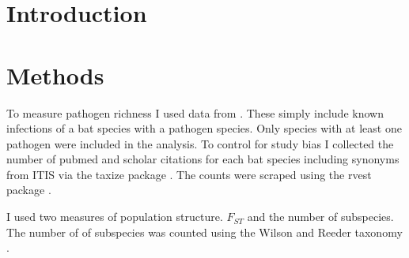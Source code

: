 
\clearpage
\section{Introduction}







\clearpage
\section{Methods}


To measure pathogen richness I used data from \cite{luis2013comparison}. 
These simply include known infections of a bat species with a pathogen species. 
Only species with at least one pathogen were included in the analysis.
To control for study bias I collected the number of pubmed and scholar citations for each bat species including synonyms from ITIS \cite{itis} via the taxize package \cite{chamberlain2013taxize}.
The counts were scraped using the rvest package \cite{rvest}.






I used two measures of population structure. 
$F_{ST}$ and the number of subspecies.
The number of of subspecies was counted using the Wilson and Reeder taxonomy \cite{wilson2005mammal}.

